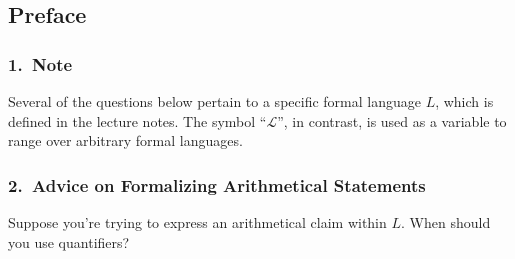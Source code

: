 \documentclass[12pt,a4paper]{article}
\begin{document}




\subsection*{Preface}

\subsubsection*{1.~Note}

Several of the questions below pertain to a specific formal language $L$, which is defined in the lecture notes. The symbol ``$\mathcal{L}$'', in contrast, is used as a variable to range over arbitrary formal languages.

\subsubsection*{2.~Advice on Formalizing Arithmetical Statements}

Suppose you're trying to express an arithmetical claim within $L$. When should you use quantifiers? 
\end{document}
